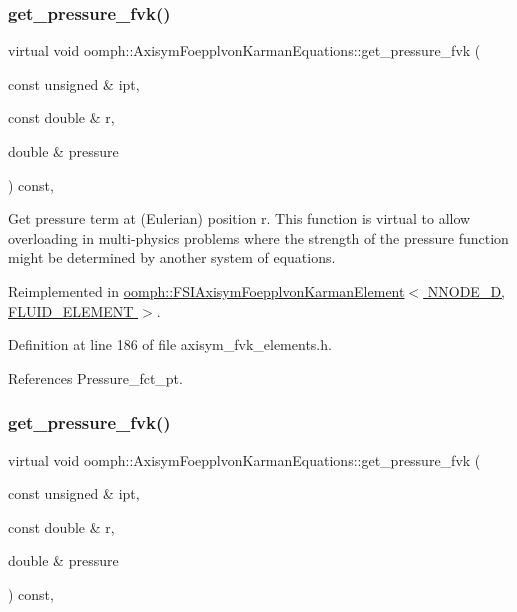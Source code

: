 \subsubsection{\texorpdfstring{get\+\_\+pressure\+\_\+fvk()}{get\_pressure\_fvk()}\hspace{0.1cm}{\footnotesize\ttfamily [1/2]}}
{\footnotesize\ttfamily virtual void oomph\+::\+Axisym\+Foepplvon\+Karman\+Equations\+::get\+\_\+pressure\+\_\+fvk (\begin{DoxyParamCaption}\item[{const unsigned \&}]{ipt,  }\item[{const double \&}]{r,  }\item[{double \&}]{pressure }\end{DoxyParamCaption}) const\hspace{0.3cm}{\ttfamily [inline]}, {\ttfamily [virtual]}}



Get pressure term at (Eulerian) position r. This function is virtual to allow overloading in multi-\/physics problems where the strength of the pressure function might be determined by another system of equations. 



Reimplemented in \hyperlink{classoomph_1_1FSIAxisymFoepplvonKarmanElement_a96b9277c8b9ff3ca40f25851fa30b34e}{oomph\+::\+F\+S\+I\+Axisym\+Foepplvon\+Karman\+Element$<$ N\+N\+O\+D\+E\+\_\+D, F\+L\+U\+I\+D\+\_\+\+E\+L\+E\+M\+E\+N\+T $>$}.



Definition at line 186 of file axisym\+\_\+fvk\+\_\+elements.\+h.



References Pressure\+\_\+fct\+\_\+pt.

\mbox{\label{classoomph_1_1AxisymFoepplvonKarmanEquations_acadd8cb7ef617690c79c0c76d7ed0000}} 
\subsubsection{\texorpdfstring{get\+\_\+pressure\+\_\+fvk()}{get\_pressure\_fvk()}\hspace{0.1cm}{\footnotesize\ttfamily [2/2]}}
{\footnotesize\ttfamily virtual void oomph\+::\+Axisym\+Foepplvon\+Karman\+Equations\+::get\+\_\+pressure\+\_\+fvk (\begin{DoxyParamCaption}\item[{const unsigned \&}]{ipt,  }\item[{const double \&}]{r,  }\item[{double \&}]{pressure }\end{DoxyParamCaption}) const\hspace{0.3cm}{\ttfamily [inline]}, {\ttfamily [virtual]}}



